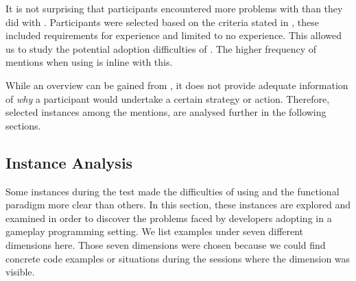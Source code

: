 It is not surprising that participants encountered more problems with \fs than they did with \cs. Participants were selected based on the criteria stated in , these included requirements for \cs experience and limited to no  \fs experience. This allowed us to study the potential adoption difficulties of \fs. The higher frequency of mentions when using \fs is inline with this.

While an overview can be gained from , it does not provide adequate information of \textit{why} a participant would undertake a certain strategy or action. Therefore, selected instances among the mentions, are analysed further in the following sections.

\subsection{Instance Analysis}
Some instances during the test made the difficulties of using \fs and the functional paradigm more clear than others. In this section, these instances are explored and examined in order to discover the problems faced by developers adopting \fs in a gameplay programming setting. We list examples under seven different dimensions here. Those seven dimensions were chosen because we could find concrete code examples or situations during the sessions where the dimension was visible.%










